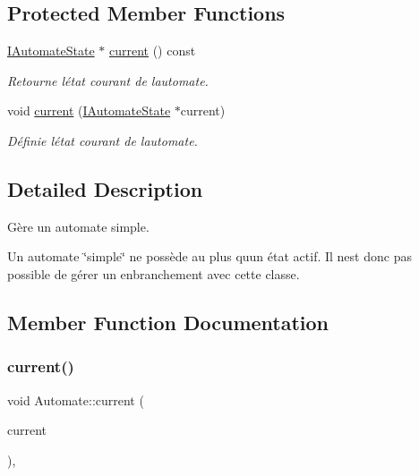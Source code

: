 \subsection*{Protected Member Functions}
\begin{DoxyCompactItemize}
\item 
\mbox{\label{classAutomate_ae252283b4c9ffff3ae601ad2cdb89ccd}} 
\hyperlink{classIAutomateState}{I\+Automate\+State} $\ast$ \hyperlink{classAutomate_ae252283b4c9ffff3ae601ad2cdb89ccd}{current} () const
\begin{DoxyCompactList}\small\item\em Retourne l\textquotesingle{}état courant de l\textquotesingle{}automate. \end{DoxyCompactList}\item 
void \hyperlink{classAutomate_aed7acfdc298f502d450e993f96046cd5}{current} (\hyperlink{classIAutomateState}{I\+Automate\+State} $\ast$current)
\begin{DoxyCompactList}\small\item\em Définie l\textquotesingle{}état courant de l\textquotesingle{}automate. \end{DoxyCompactList}\end{DoxyCompactItemize}


\subsection{Detailed Description}
Gère un automate simple. 

Un automate \char`\"{}simple\char`\"{} ne possède au plus qu\textquotesingle{}un état actif. Il n\textquotesingle{}est donc pas possible de gérer un enbranchement avec cette classe. 

\subsection{Member Function Documentation}
\mbox{\label{classAutomate_aed7acfdc298f502d450e993f96046cd5}} 
\subsubsection{\texorpdfstring{current()}{current()}}
{\footnotesize\ttfamily void Automate\+::current (\begin{DoxyParamCaption}\item[{\hyperlink{classIAutomateState}{I\+Automate\+State} $\ast$}]{current }\end{DoxyParamCaption})\hspace{0.3cm}{\ttfamily [inline]}, {\ttfamily [protected]}}



